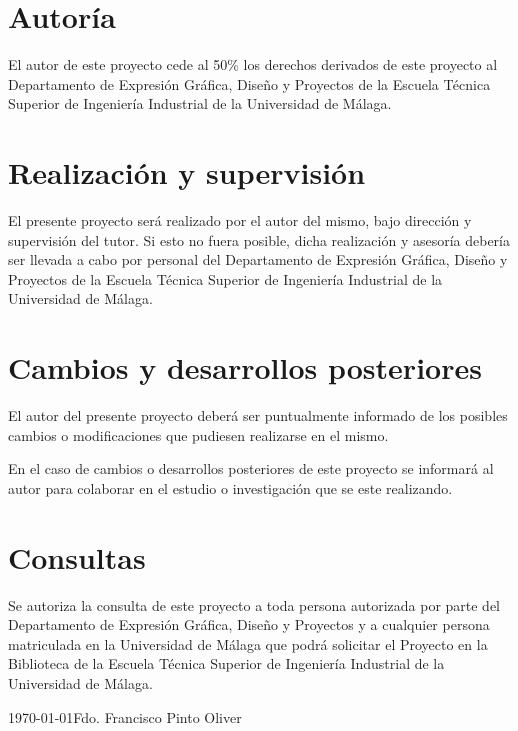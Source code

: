 \section{Autoría}
El autor de este proyecto cede al 50\% los derechos derivados de este proyecto al Departamento de Expresión Gráfica, Diseño y Proyectos de la Escuela Técnica Superior de Ingeniería Industrial de la Universidad de Málaga.

\section{Realización y supervisión}
El presente proyecto será realizado por el autor del mismo, bajo dirección y supervisión del tutor. Si esto no fuera posible, dicha realización y asesoría debería ser llevada a cabo por personal del Departamento de Expresión Gráfica, Diseño y Proyectos de la Escuela Técnica Superior de Ingeniería Industrial de la Universidad de Málaga.

\section{Cambios y desarrollos posteriores}
El autor del presente proyecto deberá ser puntualmente informado de los posibles cambios o modificaciones que pudiesen realizarse en el mismo.

En el caso de cambios o desarrollos posteriores de este proyecto se informará al autor para colaborar en el estudio o investigación que se este realizando.

\section{Consultas}
Se autoriza la consulta de este proyecto a toda persona autorizada por parte del Departamento de Expresión Gráfica, Diseño y Proyectos y a cualquier persona matriculada en la Universidad de Málaga que podrá solicitar el Proyecto en la Biblioteca de la Escuela Técnica Superior de Ingeniería Industrial de la Universidad de Málaga.

\vspace{1cm}
\today \hfill Fdo. Francisco Pinto Oliver
